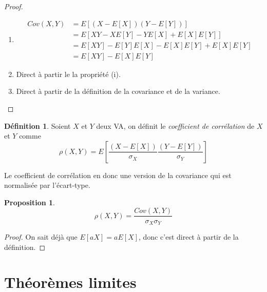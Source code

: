 \documentclass[a4paper,12pt]{report}
\theoremstyle{definition}
\renewcommand{\(}{\left(}
\renewcommand{\)}{\right)}
\renewcommand{\d}{\textit}
\newtheorem{defn}[thm]{Définition}
\newtheorem{prop}[thm]{Proposition}
\begin{document}
            \begin{proof}
                ${}$
                \begin{enumerate}[label = (\roman*)]
                    \item 
                    \begin{align*}
                    Cov(X,Y) &= E[(X-E[X])(Y-E[Y])] \\
                    &= E[XY-XE[Y]-YE[X]+E[X]E[Y]] \\
                    &= E[XY]-E[Y]E[X]-E[X]E[Y]+E[X]E[Y] \\
                    &= E[XY]-E[X]E[Y]
                    \end{align*}
                    \item Direct à partir le la propriété (i).
                    \item Direct à partir de la définition de la covariance et de la variance.
                \end{enumerate}
            \end{proof}
            
            \begin{leftbar}
            \begin{defn}
                Soient $X$ et $Y$ deux VA, on définit le \d{coefficient de corrélation} de $X$ et $Y$ comme
                $$\rho(X,Y) = E\left[\frac{(X-E[X])}{\sigma_{X}}\frac{(Y-E[Y])}{\sigma_{Y}}\right]$$
            \end{defn}
            \end{leftbar}
            
            Le coefficient de corrélation en donc une version de la covariance qui est normalisée par l'écart-type.
            
            \begin{leftbar}
            \begin{prop}
                $$\rho(X,Y) = \frac{Cov(X,Y)}{\sigma_X\sigma_Y}$$
            \end{prop}
            \end{leftbar}
            
            \begin{proof}
                On sait déjà que $E[aX] = aE[X]$, donc c'est direct à partir de la définition.
            \end{proof}
            
\chapter{Théorèmes limites}            
            
\end{document}
